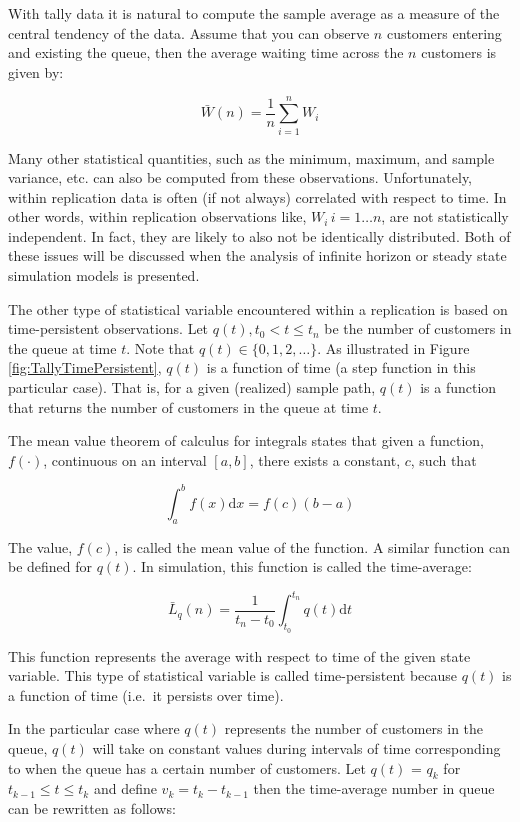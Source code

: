 \documentclass[
]{book}
\theoremstyle{definition}
\theoremstyle{definition}
\theoremstyle{definition}
\theoremstyle{definition}
\theoremstyle{remark}
\begin{document}
With tally data it is natural to compute the sample average as a measure
of the central tendency of the data. Assume that you can observe \(n\)
customers entering and existing the queue, then the average waiting time
across the \(n\) customers is given by:

\[\bar{W}(n) = \dfrac{1}{n} \sum_{i=1}^{n} W_{i}\]

Many other statistical quantities, such as the minimum, maximum, and
sample variance, etc. can also be computed from these observations.
Unfortunately, within replication data is often (if not always)
correlated with respect to time. In other words, within replication
observations like, \(W_i \, i = 1 \ldots n\), are not statistically
independent. In fact, they are likely to also not be identically
distributed. Both of these issues will be discussed when the analysis of
infinite horizon or steady state simulation models is presented.

The other type of statistical variable encountered within a replication
is based on time-persistent observations. Let \(q(t), t_0 < t \leq t_n\)
be the number of customers in the queue at time \(t\). Note that
\(q(t) \in \lbrace 0,1,2,\ldots\rbrace\). As illustrated in
Figure \ref{fig:TallyTimePersistent}, \(q(t)\) is a function of time (a step
function in this particular case). That is, for a given (realized)
sample path, \(q(t)\) is a function that returns the number of customers
in the queue at time \(t\).

The mean value theorem of calculus for integrals states that given a
function, \(f(\cdot)\), continuous on an interval \([a, b]\), there exists a
constant, \(c\), such that

\[\int_a^b f(x) \mathrm{d}x = f(c)(b-a)\]

The value, \(f(c)\), is called the mean value of the function. A similar
function can be defined for \(q(t)\). In simulation, this function is
called the time-average:

\[\bar{L}_q(n) = \frac{1}{t_n - t_0} \int_{t_0}^{t_n} q(t) \mathrm{d}t\]

This function represents the average with respect to time of the given
state variable. This type of statistical variable is called
time-persistent because \(q(t)\) is a function of time (i.e.~it persists
over time).

In the particular case where \(q(t)\) represents the number of customers
in the queue, \(q(t)\) will take on constant values during intervals of
time corresponding to when the queue has a certain number of customers.
Let \(q(t)\) = \(q_k\) for \(t_{k-1} \leq t \leq t_k\) and define
\(v_k = t_k - t_{k-1}\) then the time-average number in queue can be
rewritten as follows:
\end{document}
